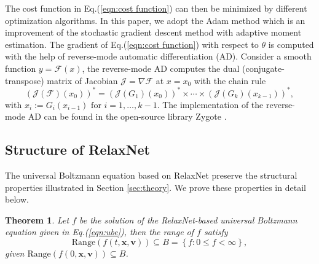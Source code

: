 \documentclass[preprint,3p,12pt,sort&compress]{elsarticle}
\newtheorem{theorem}{Theorem}
\begin{document}
The cost function in Eq.(\ref{eqn:cost function}) can then be minimized by different optimization algorithms.
In this paper, we adopt the Adam \cite{kingma2014adam} method which is an improvement of the stochastic gradient descent method with adaptive moment estimation.
The gradient of Eq.(\ref{eqn:cost function}) with respect to $\theta$ is computed with the help of reverse-mode automatic differentiation (AD).
Consider a smooth function $y = \mathscr F(x)$, the reverse-mode AD computes the dual (conjugate-transpose) matrix of Jacobian $\mathcal J = \nabla \mathscr F$ at $x = x_0$ with the chain rule
\begin{equation}
    \left(\mathcal{J}(\mathscr F)\left(x_{0}\right)\right)^{*}=\left(\mathcal{J}\left(G_{1}\right)\left(x_{0}\right)\right)^{*} \times \cdots \times\left(\mathcal{J}\left(G_{k}\right)\left(x_{k-1}\right)\right)^{*},
\end{equation}
with $x_{i}:=G_{i}\left(x_{i-1}\right) \text { for } i=1, \ldots, k-1$.
The implementation of the reverse-mode AD can be found in the open-source library Zygote \cite{innes2019differentiable}.

\subsection{Structure of RelaxNet}

The universal Boltzmann equation based on RelaxNet preserve the structural properties illustrated in Section \ref{sec:theory}.
We prove these properties in detail below.

\begin{theorem}\label{theorem:1}
Let \(f\) be the solution of the RelaxNet-based universal Boltzmann equation given in Eq.(\ref{eqn:ube}), then the range of $f$ satisfy
\begin{equation}
    \mathrm{Range}(f(t,\mathbf x,\mathbf v)) \subseteq B=\left\{ f: 0 \leq f <\infty \right\},
\end{equation}
given $\mathrm{Range}(f(0,\mathbf x,\mathbf v)) \subseteq B$.
\end{theorem}
\end{document}
